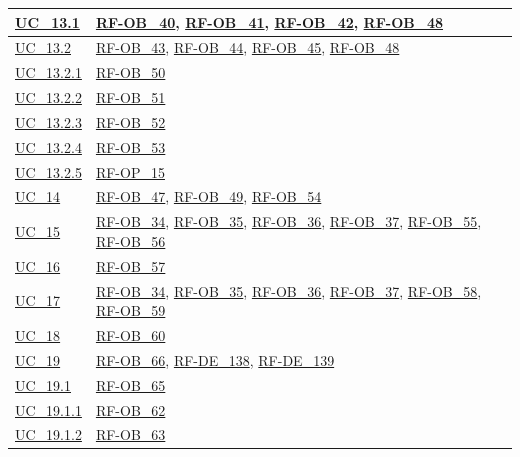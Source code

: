 \begin{longtable}{|
        >{\raggedright\arraybackslash}p{} |
        >{\raggedright\arraybackslash}p{} |
    }
    \hline
    \hyperref[uc_13.1]{UC\_13.1} & \hyperlink{rf-ob_40}{RF-OB\_40}, \hyperlink{rf-ob_41}{RF-OB\_41}, \hyperlink{rf-ob_42}{RF-OB\_42}, \hyperlink{rf-ob_48}{RF-OB\_48} \\
    \hline
    \hyperref[uc_13.2]{UC\_13.2} & \hyperlink{rf-ob_43}{RF-OB\_43}, \hyperlink{rf-ob_44}{RF-OB\_44}, \hyperlink{rf-ob_45}{RF-OB\_45}, \hyperlink{rf-ob_48}{RF-OB\_48} \\
    \hline
    \hyperref[uc_13.2.1]{UC\_13.2.1} & \hyperlink{rf-ob_50}{RF-OB\_50} \\
    \hline
    \hyperref[uc_13.2.2]{UC\_13.2.2} & \hyperlink{rf-ob_51}{RF-OB\_51} \\
    \hline
    \hyperref[uc_13.2.3]{UC\_13.2.3} & \hyperlink{rf-ob_52}{RF-OB\_52} \\
    \hline
    \hyperref[uc_13.2.4]{UC\_13.2.4} & \hyperlink{rf-ob_53}{RF-OB\_53} \\
    \hline
    \hyperref[uc_13.2.5]{UC\_13.2.5} & \hyperlink{rf-op_15}{RF-OP\_15} \\
    \hline
    \hyperref[uc_14]{UC\_14} & \hyperlink{rf-ob_47}{RF-OB\_47}, \hyperlink{rf-ob_49}{RF-OB\_49}, \hyperlink{rf-ob_54}{RF-OB\_54} \\
    \hline
    \hyperref[uc_15]{UC\_15} & \hyperlink{rf-ob_34}{RF-OB\_34}, \hyperlink{rf-ob_35}{RF-OB\_35}, \hyperlink{rf-ob_36}{RF-OB\_36}, \hyperlink{rf-ob_37}{RF-OB\_37}, \hyperlink{rf-ob_55}{RF-OB\_55}, \hyperlink{rf-ob_56}{RF-OB\_56} \\
    \hline
    \hyperref[uc_16]{UC\_16} & \hyperlink{rf-ob_57}{RF-OB\_57} \\
    \hline
    \hyperref[uc_17]{UC\_17} & \hyperlink{rf-ob_34}{RF-OB\_34}, \hyperlink{rf-ob_35}{RF-OB\_35}, \hyperlink{rf-ob_36}{RF-OB\_36}, \hyperlink{rf-ob_37}{RF-OB\_37}, \hyperlink{rf-ob_58}{RF-OB\_58}, \hyperlink{rf-ob_59}{RF-OB\_59} \\
    \hline
    \hyperref[uc_18]{UC\_18} & \hyperlink{rf-ob_60}{RF-OB\_60} \\
    \hline
    \hyperref[uc_19]{UC\_19} & \hyperlink{rf-ob_66}{RF-OB\_66}, \hyperlink{rf-de_138}{RF-DE\_138}, \hyperlink{rf-de_139}{RF-DE\_139} \\
    \hline
    \hyperref[uc_19.1]{UC\_19.1} & \hyperlink{rf-ob_65}{RF-OB\_65} \\
    \hline
    \hyperref[uc_19.1.1]{UC\_19.1.1} & \hyperlink{rf-ob_62}{RF-OB\_62} \\
    \hline
    \hyperref[uc_19.1.2]{UC\_19.1.2} & \hyperlink{rf-ob_63}{RF-OB\_63} \\

\end{longtable}
